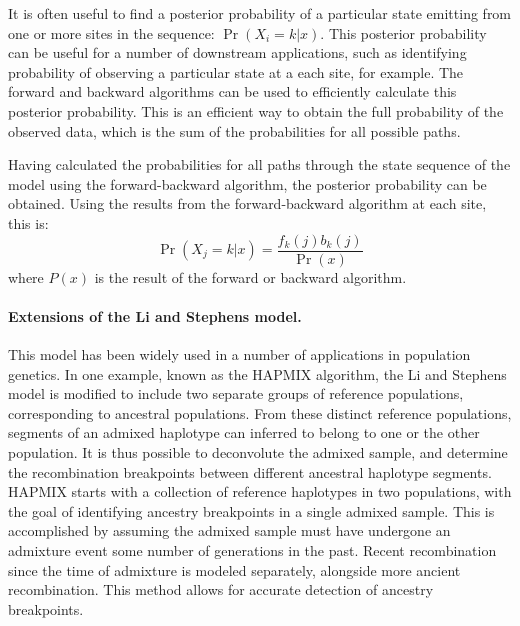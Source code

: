 %
It is often useful to find a posterior probability of a particular state emitting from one or more sites in the sequence:
$\Pr( X_i = k | x )$.
This posterior probability can be useful for a number of downstream applications, such as identifying probability of observing a particular state at a each site, for example.
The forward and backward algorithms can be used to efficiently calculate this posterior probability.
This is an efficient way to obtain the full probability of the observed data, which is the sum of the probabilities for all possible paths.


Having calculated the probabilities for all paths through the state sequence of the model using the forward-backward algorithm, the posterior probability can be obtained.
Using the results from the forward-backward algorithm at each site, this is:
\begin{equation}
    \Pr( X_j = k | x ) = \frac{ f_k(j) b_k(j) }{ \Pr(x) } 
\end{equation}
where $P(x)$ is the result of the forward or backward algorithm.



\paragraph{Extensions of the Li and Stephens model.}
This model has been widely used in a number of applications in population genetics.
In one example, known as the HAPMIX algorithm\cite{Price2009}, the Li and Stephens model is modified to include two separate groups of reference populations, corresponding to ancestral populations.
From these distinct reference populations, segments of an admixed haplotype can inferred to belong to one or the other population.
It is thus possible to deconvolute the admixed sample, and determine the recombination breakpoints between different ancestral haplotype segments.
HAPMIX starts with a collection of reference haplotypes in two populations, with the goal of identifying ancestry breakpoints in a single admixed sample.
This is accomplished by assuming the admixed sample must have undergone an admixture event some number of generations in the past.
Recent recombination since the time of admixture is modeled separately, alongside more ancient recombination.
This method allows for accurate detection of ancestry breakpoints.

